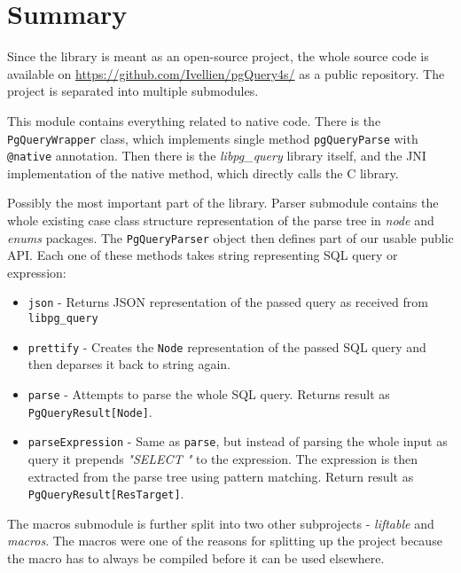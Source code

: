 \section{Summary}
Since the library is meant as an open-source project, the whole source code is available on \url{https://github.com/Ivellien/pgQuery4s/} as a public repository. The project is separated into multiple submodules.

\begin{description}[font=$\bullet$~\normalfont\scshape\color{black}\\]
\item [Native] \hfill \newline
This module contains everything related to native code. There is the \texttt{PgQueryWrapper} class, which implements single method \texttt{pgQueryParse} with \texttt{@native} annotation. Then there is the \textit{libpg\_query} library itself, and the JNI implementation of the native method, which directly calls the C library.
\item [Parser] \hfill \newline
Possibly the most important part of the library. Parser submodule contains the whole existing case class structure representation of the parse tree in \textit{node} and \textit{enums} packages. The \texttt{PgQueryParser} object then defines part of our usable public API. Each one of these methods takes string representing SQL query or expression: 
\begin{itemize}
    \item \texttt{json} - Returns JSON representation of the passed query as received from \texttt{libpg\_query}
    \item \texttt{prettify} - Creates the \texttt{Node} representation of the passed SQL query and then deparses it back to string again.
    \item \texttt{parse} - Attempts to parse the whole SQL query. Returns result as \texttt{PgQueryResult[Node]}.
    \item \texttt{parseExpression} - Same as \texttt{parse}, but instead of parsing the whole input as query it prepends \textit{"SELECT "} to the expression. The expression is then extracted from the parse tree using pattern matching. Return result as \texttt{PgQueryResult[ResTarget]}.
\end{itemize}

\item [Macros] \hfill \newline
The macros submodule is further split into two other subprojects - \textit{liftable} and \textit{macros}. The macros were one of the reasons for splitting up the project because the macro has to always be compiled before it can be used elsewhere. 


\end{description}
